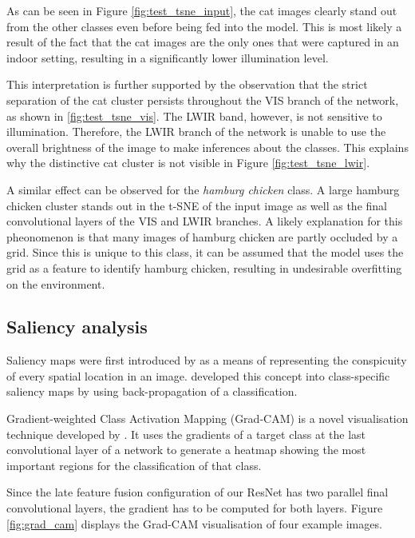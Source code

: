 \documentclass{l4proj}
\begin{document}
As can be seen in Figure \ref{fig:test_tsne_input}, the cat images clearly stand out from the other classes even before being fed into the model. This is most likely a result of the fact that the cat images are the only ones that were captured in an indoor setting, resulting in a significantly lower illumination level.

This interpretation is further supported by the observation that the strict separation of the cat cluster persists throughout the VIS branch of the network, as shown in \ref{fig:test_tsne_vis}. The LWIR band, however, is not sensitive to illumination. Therefore, the LWIR branch of the network is unable to use the overall brightness of the image to make inferences about the classes. This explains why the distinctive cat cluster is not visible in Figure \ref{fig:test_tsne_lwir}.

A similar effect can be observed for the \textit{hamburg chicken} class. A large hamburg chicken cluster stands out in the t-SNE of the input image as well as the final convolutional layers of the VIS and LWIR branches. A likely explanation for this pheonomenon is that many images of hamburg chicken are partly occluded by a grid. Since this is unique to this class, it can be assumed that the model uses the grid as a feature to identify hamburg chicken, resulting in undesirable overfitting on the environment.


\subsection{Saliency analysis}

Saliency maps were first introduced by \citet{itti_model_1998} as a means of representing the conspicuity of every spatial location in an image. \citet{simonyan_deep_2014} developed this concept into class-specific saliency maps by using back-propagation of a classification.

Gradient-weighted Class Activation Mapping (Grad-CAM) is a novel visualisation technique developed by \citet{selvaraju_grad-cam_2020}. It uses the gradients of a target class at the last convolutional layer of a network to generate a heatmap showing the most important regions for the classification of that class.

Since the late feature fusion configuration of our ResNet has two parallel final convolutional layers, the gradient has to be computed for both layers. Figure \ref{fig:grad_cam} displays the Grad-CAM visualisation of four example images.
\end{document}
